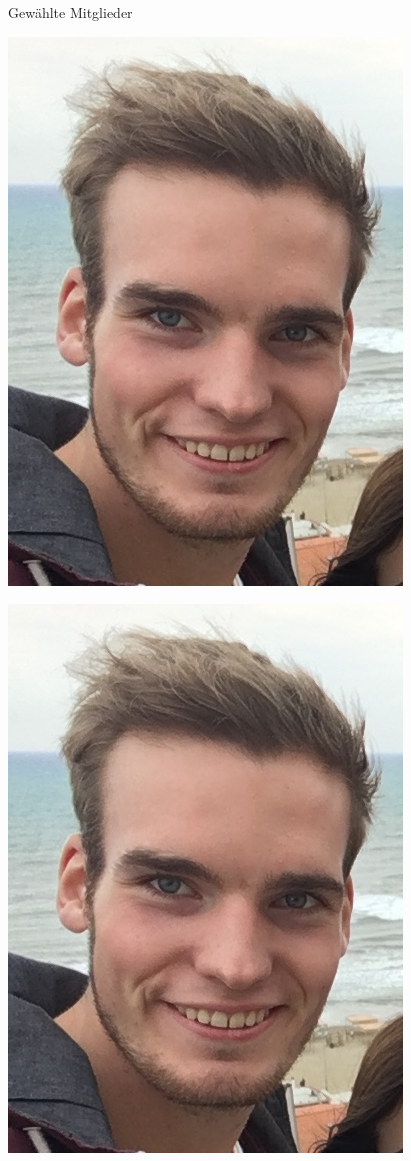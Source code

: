 \documentclass[compress, aspectratio=169]{beamer}
\begin{document}
\begin{frame}{Gewählte Mitglieder}
  \hspace{0.1\textwidth}
  \begin{minipage}{.3\textwidth}
    \centering
    \includegraphics[height=0.25\textheight]{chris.jpeg}
  \end{minipage}
  \hspace{0.1\textwidth}
  \begin{minipage}{.3\textwidth}
    \centering
    \includegraphics[height=0.25\textheight]{chris.jpeg}

\end{minipage}
\end{frame}
\end{document}
